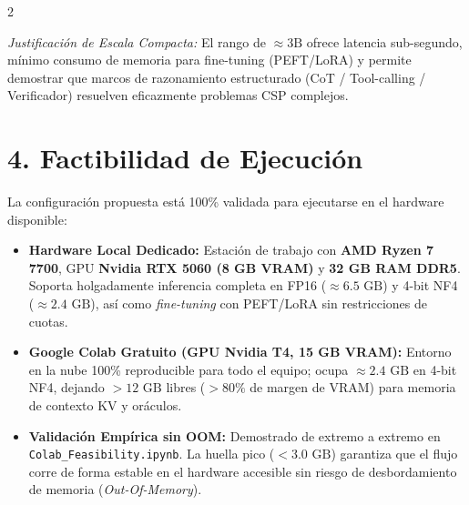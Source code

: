 \documentclass[9.5pt,a4paper]{extarticle}
\begin{document}
\begin{multicols}{2}
\begin{center}
\vspace{-2pt}
\vspace{-2pt}
\end{center}

\textit{Justificación de Escala Compacta:} El rango de $\approx 3\text{B}$ ofrece latencia sub-segundo, mínimo consumo de memoria para fine-tuning (PEFT/LoRA) y permite demostrar que marcos de razonamiento estructurado (CoT / Tool-calling / Verificador) resuelven eficazmente problemas CSP complejos.

\section{4. Factibilidad de Ejecución}
La configuración propuesta está 100\% validada para ejecutarse en el hardware disponible:
\begin{itemize}[label=$\blacktriangleright$]
    \item \textbf{Hardware Local Dedicado:} Estación de trabajo con \textbf{AMD Ryzen 7 7700}, GPU \textbf{Nvidia RTX 5060 (8 GB VRAM)} y \textbf{32 GB RAM DDR5}. Soporta holgadamente inferencia completa en FP16 ($\approx 6.5\text{ GB}$) y 4-bit NF4 ($\approx 2.4\text{ GB}$), así como \textit{fine-tuning} con PEFT/LoRA sin restricciones de cuotas.
    \item \textbf{Google Colab Gratuito (GPU Nvidia T4, 15 GB VRAM):} Entorno en la nube 100\% reproducible para todo el equipo; ocupa $\approx 2.4\text{ GB}$ en 4-bit NF4, dejando $>12\text{ GB}$ libres ($>80\%$ de margen de VRAM) para memoria de contexto KV y oráculos.
    \item \textbf{Validación Empírica sin OOM:} Demostrado de extremo a extremo en \texttt{Colab\_Feasibility.ipynb}. La huella pico ($<3.0\text{ GB}$) garantiza que el flujo corre de forma estable en el hardware accesible sin riesgo de desbordamiento de memoria (\textit{Out-Of-Memory}).
\end{itemize}


\end{multicols}
\end{document}
